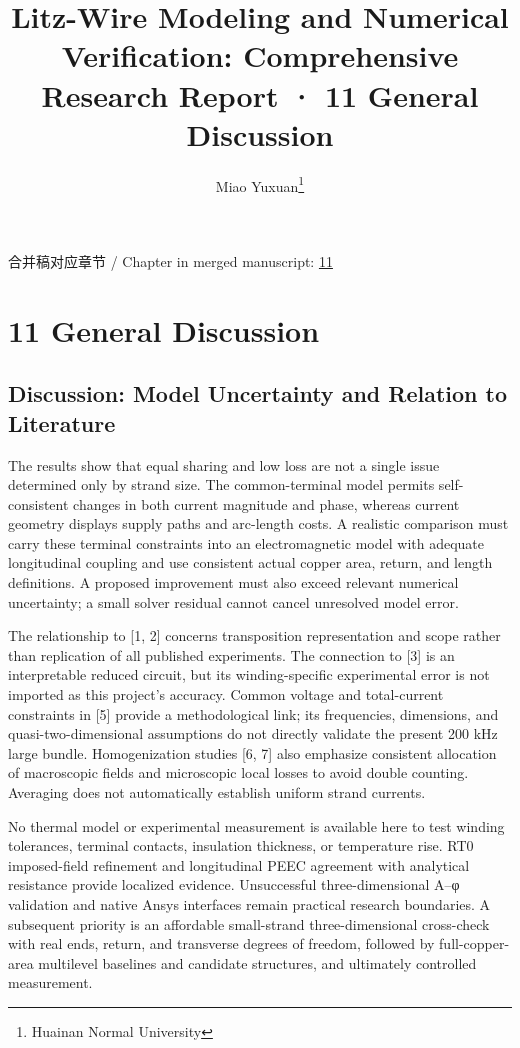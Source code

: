 \documentclass[journal,10pt]{IEEEtran}
\begin{document}
\title{Litz-Wire Modeling and Numerical Verification: Comprehensive Research Report · 11 General Discussion}
\author{Miao Yuxuan\thanks{Huainan Normal University}}

\maketitle
\noindent 合并稿对应章节 / Chapter in merged manuscript: \href{report_en_ieee.pdf#chapter-11}{11}\par
\FloatBarrier
\section*{11 General Discussion}
\hypertarget{chapter-11}{}
\subsection*{Discussion: Model Uncertainty and Relation to Literature}
\hypertarget{11.discussion.heading}{}
The results show that equal sharing and low loss are not a single issue determined only by strand size. The common-terminal model permits self-consistent changes in both current magnitude and phase, whereas current geometry displays supply paths and arc-length costs. A realistic comparison must carry these terminal constraints into an electromagnetic model with adequate longitudinal coupling and use consistent actual copper area, return, and length definitions. A proposed improvement must also exceed relevant numerical uncertainty; a small solver residual cannot cancel unresolved model error.


The relationship to [1, 2] concerns transposition representation and scope rather than replication of all published experiments. The connection to [3] is an interpretable reduced circuit, but its winding-specific experimental error is not imported as this project’s accuracy. Common voltage and total-current constraints in [5] provide a methodological link; its frequencies, dimensions, and quasi-two-dimensional assumptions do not directly validate the present 200 kHz large bundle. Homogenization studies [6, 7] also emphasize consistent allocation of macroscopic fields and microscopic local losses to avoid double counting. Averaging does not automatically establish uniform strand currents.


No thermal model or experimental measurement is available here to test winding tolerances, terminal contacts, insulation thickness, or temperature rise. RT0 imposed-field refinement and longitudinal PEEC agreement with analytical resistance provide localized evidence. Unsuccessful three-dimensional A–φ validation and native Ansys interfaces remain practical research boundaries. A subsequent priority is an affordable small-strand three-dimensional cross-check with real ends, return, and transverse degrees of freedom, followed by full-copper-area multilevel baselines and candidate structures, and ultimately controlled measurement.
\end{document}
